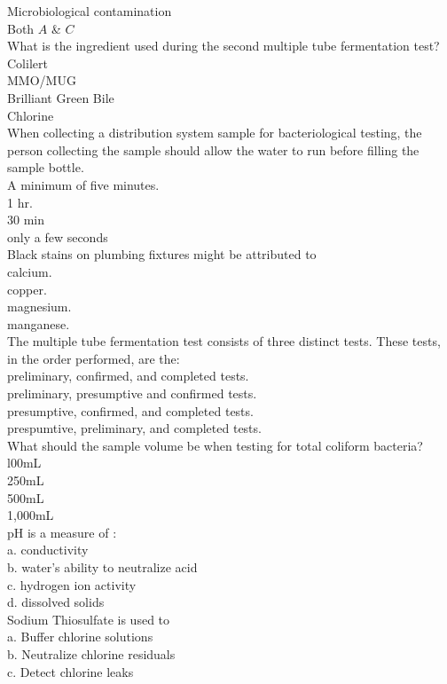 Microbiological contamination\\
Both $A$ \& $C$\\
 What is the ingredient used during the second multiple tube fermentation test?\\
Colilert\\
MMO/MUG\\
Brilliant Green Bile\\
Chlorine\\
When collecting a distribution system sample for bacteriological testing, the person collecting the sample should allow the water to run before filling the sample bottle.\\
A minimum of five minutes.\\
1 hr.\\
30 min\\
only a few seconds\\
Black stains on plumbing fixtures might be attributed to\\
calcium.\\
copper.\\
magnesium.\\
manganese.\\
The multiple tube fermentation test consists of three distinct tests. These tests, in the order performed, are the:\\
preliminary, confirmed, and completed tests.\\
preliminary, presumptive and confirmed tests.\\
presumptive, confirmed, and completed tests.\\
prespumtive, preliminary, and completed tests.\\
What should the sample volume be when testing for total coliform bacteria?\\
l00mL\\
250mL\\
500mL\\
1,000mL\\
$\mathrm{pH}$ is a measure of :\\
a. conductivity\\
b. water's ability to neutralize acid\\
c. hydrogen ion activity\\
d. dissolved solids\\
 Sodium Thiosulfate is used to\\
a. Buffer chlorine solutions\\
b. Neutralize chlorine residuals\\
c. Detect chlorine leaks\\
